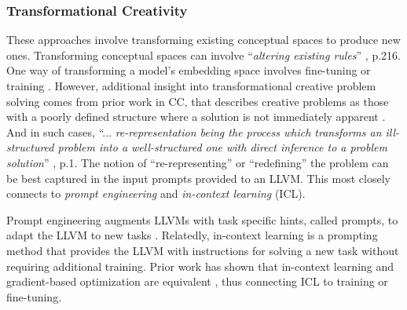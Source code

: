 \subsubsection{Transformational Creativity}
These approaches involve transforming existing conceptual spaces to produce new ones. Transforming conceptual spaces can involve ``\textit{altering existing rules}'' \cite{boden1998creativity}, p.216. One way of transforming a model's embedding space involves fine-tuning or training \cite{franceschelli2023creativity}. However, additional insight into transformational creative problem solving comes from prior work in CC, that describes creative problems as those with a poorly defined structure where a solution is not immediately apparent \cite{olteteanu2014two}. And in such cases, ``...\textit{ re-representation being the process which transforms an ill-structured problem into a well-structured one with direct inference to a problem solution}'' \cite{olteteanu2014two}, p.1. The notion of ``re-representing'' or ``redefining'' the problem can be best captured in the input prompts provided to an LLVM. This most closely connects to \textit{prompt engineering} and \textit{in-context learning} (ICL). 

Prompt engineering augments LLVMs with task specific hints, called prompts, to adapt the LLVM to new tasks \cite{gu2023systematic}. Relatedly, in-context learning is a prompting method that provides the LLVM with instructions for solving a new task without requiring additional training. Prior work has shown that in-context learning and gradient-based optimization are equivalent \cite{von2023transformers}, thus connecting ICL to training or fine-tuning. 

